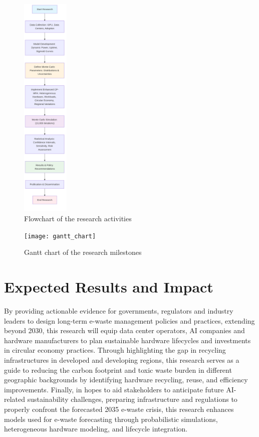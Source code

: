 \documentclass[a4paper, 12pt]{article}
\begin{document}
\begin{figure}[h]
    \begin{center}
        \includegraphics[width=0.2\textwidth]{flowchart}
    \end{center}
    \caption{Flowchart of the research activities}\label{fig:flowchart}
\end{figure}

\begin{figure}[ht]
    \begin{center}
        \texttt{[image: gantt\_chart]}
    \end{center}
    \caption{Gantt chart of the research milestones}\label{fig:gantt_chart}
\end{figure}

\section{Expected Results and Impact}
By providing actionable evidence for governments, regulators and industry leaders to design long-term e-waste management policies and practices, extending beyond 2030, this research will equip data center operators, AI companies and hardware manufacturers to plan sustainable hardware lifecycles and investments in circular economy practices. Through highlighting the gap in recycling infrastructures in developed and developing regions, this research serves as a guide to reducing the carbon footprint and toxic waste burden in different geographic backgrounds by identifying hardware recycling, reuse, and efficiency improvements. Finally, in hopes to aid stakeholders to anticipate future AI-related sustainability challenges, preparing infrastructure and regulations to properly confront the forecasted 2035 e-waste crisis, this research enhances models used for e-waste forecasting through probabilistic simulations, heterogeneous hardware modeling, and lifecycle integration.

\printbibliography
\end{document}

